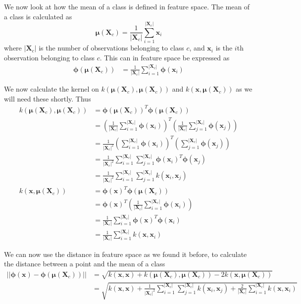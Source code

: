 \documentclass[a4paper, 11pt]{article}
\begin{document}
We now look at how the mean of a class is defined in feature space. The mean of a class is calculated as
\[
    \bm\mu(\mathbf{X}_c) = \frac{1}{|\mathbf{X}_c|} \sum_{i=1}^{|\mathbf{X}_c|} \mathbf{x}_i
\]
where $|\mathbf{X}_c|$ is the number of observations belonging to class $c$, and $\mathbf{x}_i$ is the $i$th observation belonging to class $c$. This can in feature space be expressed as
\begin{align*}
    \bm\phi(\bm\mu(\mathbf{X}_c))
    &= \frac{1}{|\mathbf{X}_c|} \sum_{i=1}^{|\mathbf{X}_c|} \bm\phi(\mathbf{x}_i)
\end{align*}

We now calculate the kernel on $k(\bm\mu(\mathbf{X}_c), \bm\mu(\mathbf{X}_c))$ and $k(\mathbf{x}, \bm\mu(\mathbf{X}_c))$ as we will need these shortly. Thus
\begin{align*}
    k(\bm\mu(\mathbf{X}_c), \bm\mu(\mathbf{X}_c))
    &= {\bm\phi(\bm\mu(\mathbf{X}_c))}^T \bm\phi(\bm\mu(\mathbf{X}_c)) \\
    &= {\left( \frac{1}{|\mathbf{X}_c|} \sum_{i=1}^{|\mathbf{X}_c|} \bm\phi(\mathbf{x}_i) \right)}^T \left( \frac{1}{|\mathbf{X}_c|} \sum_{j=1}^{|\mathbf{X}_c|} \bm\phi(\mathbf{x}_j) \right) \\
    &= \frac{1}{|\mathbf{X}_c|^2} {\left( \sum_{i=1}^{|\mathbf{X}_c|} \bm\phi(\mathbf{x}_i) \right)}^T \left( \sum_{j=1}^{|\mathbf{X}_c|} \bm\phi(\mathbf{x}_j) \right) \\
    &= \frac{1}{|\mathbf{X}_c|^2} \sum_{i=1}^{|\mathbf{X}_c|}\sum_{j=1}^{|\mathbf{X}_c|} {\bm\phi(\mathbf{x}_i)}^T \bm\phi(\mathbf{x}_j) \\
    &= \frac{1}{|\mathbf{X}_c|^2} \sum_{i=1}^{|\mathbf{X}_c|}\sum_{j=1}^{|\mathbf{X}_c|} k(\mathbf{x}_i, \mathbf{x}_j) \\
    k(\mathbf{x}, \bm\mu(\mathbf{X}_c))
    &= {\bm\phi(\mathbf{x})}^T \bm\phi(\bm\mu(\mathbf{X}_c)) \\
    &= {\bm\phi(\mathbf{x})}^T \left( \frac{1}{|\mathbf{X}_c|} \sum_{i=1}^{|\mathbf{X}_c|} \bm\phi(\mathbf{x}_i) \right) \\
    &= \frac{1}{|\mathbf{X}_c|} \sum_{i=1}^{|\mathbf{X}_c|} {\bm\phi(\mathbf{x})}^T \bm\phi(\mathbf{x}_i) \\
    &= \frac{1}{|\mathbf{X}_c|} \sum_{i=1}^{|\mathbf{X}_c|} k(\mathbf{x},\mathbf{x}_i)
\end{align*}

We can now use the distance in feature space as we found it before, to calculate the distance between a point and the mean of a class
\begin{align*}
    || \bm\phi(\mathbf{x}) - \bm\phi(\bm\mu(\mathbf{X}_c)) ||
    &= \sqrt{k(\mathbf{x}, \mathbf{x}) + k(\bm\mu(\mathbf{X}_c), \bm\mu(\mathbf{X}_c)) - 2 k(\mathbf{x}, \bm\mu(\mathbf{X}_c))} \\
    &= \sqrt{k(\mathbf{x}, \mathbf{x}) + \frac{1}{|\mathbf{X}_c|^2} \sum_{i=1}^{|\mathbf{X}_c|}\sum_{j=1}^{|\mathbf{X}_c|} k(\mathbf{x}_i, \mathbf{x}_j) + \frac{2}{|\mathbf{X}_c|} \sum_{i=1}^{|\mathbf{X}_c|} k(\mathbf{x},\mathbf{x}_i)}
\end{align*}
\end{document}

